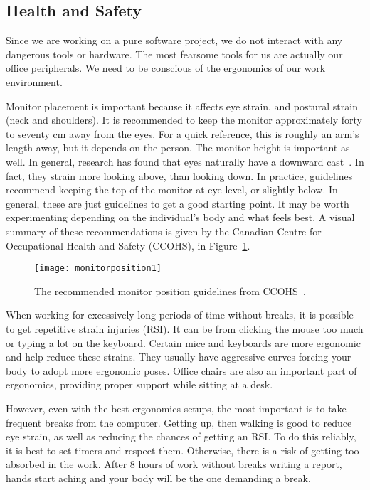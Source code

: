 \subsection{Health and Safety}\label{subsec:healthnsafety}

Since we are working on a pure software project,
we do not interact with any dangerous tools or hardware.
The most fearsome tools for us are actually our office peripherals.
We need to be conscious of the ergonomics of our work environment.


Monitor placement is important because it affects eye strain, and postural strain (neck and shoulders).
It is recommended to keep the monitor approximately forty to seventy cm away from the eyes.
For a quick reference, this is roughly an arm's length away, but it depends on the person.
The monitor height is important as well.
In general, research has found that eyes naturally have a downward cast~\cite{health_and_safety}.
In fact, they strain more looking above, than looking down.
In practice, guidelines recommend keeping the top of the monitor at eye level, or slightly below.
In general, these are just guidelines to get a good starting point.
It may be worth experimenting depending on the individual's body and what feels best.
A visual summary of these recommendations is given by the Canadian Centre for Occupational Health and Safety (CCOHS), in Figure~\ref{fig:monitor-pos}. %
\begin{figure}[h]
    \centering
    \texttt{[image: monitorposition1]}
    \caption{The recommended monitor position guidelines from CCOHS~\cite{health_and_safety}.}
    \label{fig:monitor-pos}
\end{figure}

When working for excessively long periods of time without breaks,
it is possible to get repetitive strain injuries (RSI).
It can be from clicking the mouse too much or typing a lot on the keyboard.
Certain mice and keyboards are more ergonomic and help reduce these strains.
They usually have aggressive curves forcing your body to adopt more ergonomic poses.
Office chairs are also an important part of ergonomics, providing proper support while sitting at a desk.

However, even with the best ergonomics setups, the most important is to take frequent breaks from the computer.
Getting up, then walking is good to reduce eye strain, as well as reducing the chances of getting an RSI.
To do this reliably, it is best to set timers and respect them.
Otherwise, there is a risk of getting too absorbed in the work.
After 8 hours of work without breaks writing a report, hands start aching and your body will be the one demanding a break.


